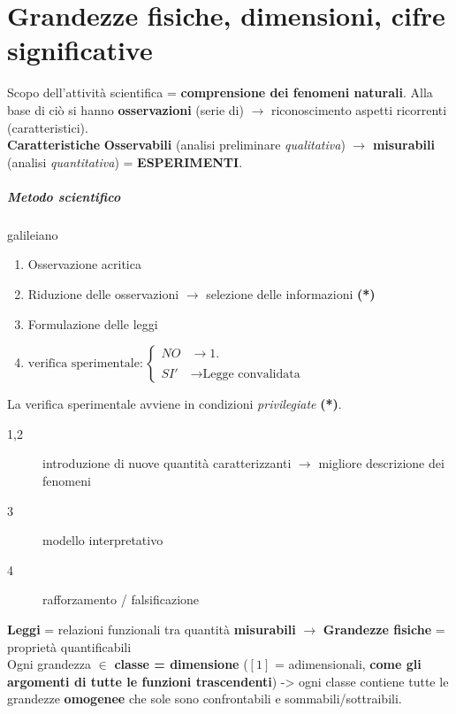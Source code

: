 \documentclass[10pt, oneside]{book}
\begin{document}
\tableofcontents
\newpage

\chapter{Grandezze fisiche, dimensioni, cifre significative}
Scopo dell'attività scientifica = \textbf{comprensione dei fenomeni naturali}. Alla base di ciò si hanno \textbf{osservazioni} (serie di) $\rightarrow$ riconoscimento aspetti ricorrenti (caratteristici).\\
\textbf{Caratteristiche} \textbf{Osservabili} (analisi preliminare \textit{qualitativa}) $\longrightarrow$ \textbf{misurabili} (analisi \textit{quantitativa}) = \textbf{ESPERIMENTI}.\\
\paragraph{Metodo scientifico} galileiano
\begin{enumerate}
\item Osservazione acritica
\item Riduzione delle osservazioni $\rightarrow$ selezione delle informazioni \textbf{(*)}
\item Formulazione delle leggi
\item $\displaystyle \textrm{verifica sperimentale} : \begin{cases} \displaystyle NO & \rightarrow 1. \\ \\ \displaystyle SI' & \rightarrow \textrm{Legge convalidata}

\end{cases}$
\end{enumerate}
La verifica sperimentale avviene in condizioni \textit{privilegiate} \textbf{(*)}.\\
\begin{description}
\item[1,2] introduzione di nuove quantità caratterizzanti $\rightarrow$ migliore descrizione dei fenomeni
\item[3] modello interpretativo
\item[4] rafforzamento / falsificazione
\end{description}
\textbf{Leggi} = relazioni funzionali tra quantità \textbf{misurabili} $\rightarrow$ \textbf{Grandezze fisiche} = proprietà quantificabili\\
Ogni grandezza $\in$ \textbf{classe = dimensione} ($\mathrm{[1]}$ = adimensionali, \textbf{come gli argomenti di tutte le funzioni trascendenti}) -> ogni classe contiene tutte le grandezze \textbf{omogenee} che sole sono confrontabili e sommabili/sottraibili.\\
\end{document}
